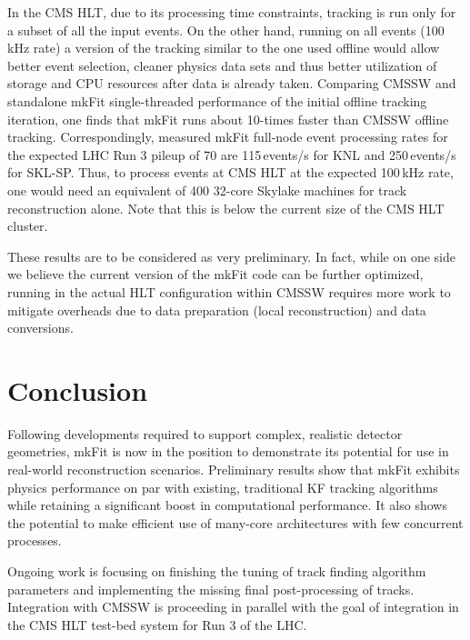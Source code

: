 \documentclass{webofc}
\def\mkfit{mkFit\xspace}
\begin{document}
In the CMS HLT, due to its processing time constraints, tracking is run only
for a subset of all the input events. On the other hand, running on all events
(100\,kHz rate) a version of the tracking similar to the one used offline
would allow better event selection, cleaner physics data sets and thus better
utilization of storage and CPU resources after data is already
taken. Comparing CMSSW and standalone \mkfit single-threaded performance of
the initial offline tracking iteration, one finds that \mkfit runs about
10-times faster than CMSSW offline tracking. Correspondingly, measured \mkfit
full-node event processing rates for the expected LHC Run 3 pileup of 70 are
115\,events/s for KNL and 250\,events/s for SKL-SP. Thus, to process events at
CMS HLT at the expected 100\,kHz rate, one would need an equivalent of 400
32-core Skylake machines for track reconstruction alone. Note that this is
below the current size of the CMS HLT cluster.

These results are to be considered as very preliminary. In fact, while on one
side we believe the current version of the \mkfit code can be further
optimized, running in the actual HLT configuration within CMSSW requires more
work to mitigate overheads due to data preparation (local reconstruction) and
data conversions.

\section{Conclusion}

Following developments required to support complex, realistic detector
geometries, \mkfit is now in the position to demonstrate its potential for use in
real-world reconstruction scenarios. Preliminary results show that \mkfit
exhibits physics performance on par with existing, traditional KF tracking
algorithms while retaining a significant boost in computational
performance. It also shows the potential to make efficient use of many-core
architectures with few concurrent processes.

Ongoing work is focusing on finishing the tuning of track finding algorithm
parameters and implementing the missing final post-processing of
tracks. Integration with CMSSW is proceeding in parallel with the goal of
integration in the CMS HLT test-bed system for Run 3 of the LHC.


\end{document}
